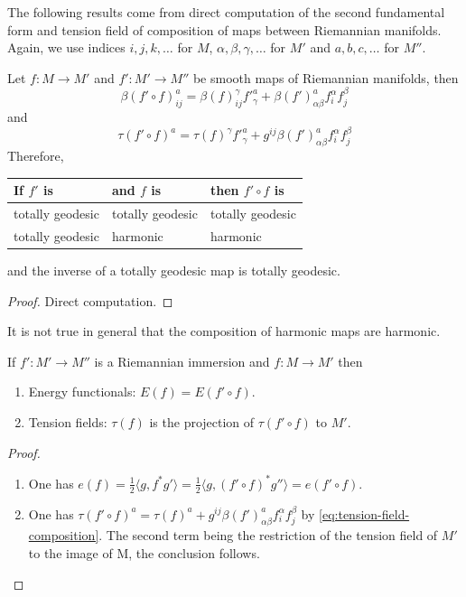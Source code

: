 The following results come from direct computation of the second fundamental form and
tension field of composition of maps between Riemannian manifolds. Again, we use indices
\(i,j,k,\dots\) for \(M\), \(\alpha,\beta,\gamma,\dots\) for \(M'\) and \(a,b,c,\dots\) for \(M''\).

\begin{proposition}
\label{prop:composition-general}
Let \(f: M \longrightarrow M'\) and \(f': M' \longrightarrow M''\) be smooth maps of
Riemannian manifolds, then
\begin{equation}
\label{eq:sff-composition}
\beta(f'\circ f)^a_{ij} = \beta(f)_{ij}^\gamma f'^a_\gamma + \beta(f')_{\alpha\beta}^a f^\alpha_i f^\beta_j
\end{equation}
and
\begin{equation}
\label{eq:tension-field-composition}
\tau(f'\circ f)^a = \tau(f)^\gamma f'^a_\gamma + g^{ij}\beta(f')^a_{\alpha\beta} f^\alpha_i f^\beta_j 
\end{equation}
Therefore,
\begin{center}
\begin{tabular}{lll}
If \(f'\) is & and \(f\)  is & then \(f'\circ f\) is\\
\hline
totally geodesic & totally geodesic & totally geodesic\\
totally geodesic & harmonic & harmonic\\
\end{tabular}
\end{center}
and the inverse of a totally geodesic map is totally geodesic.
\end{proposition}
\begin{proof}
Direct computation.
\end{proof}

\begin{remark}
It is not true in general that the composition of harmonic maps are harmonic.
\end{remark}

\begin{proposition}
\label{prop:compo-immersion}
If \(f': M' \longrightarrow M''\) is a Riemannian immersion and \(f: M \longrightarrow
M'\) then 
\begin{enumerate}
\item Energy functionals: \(E(f) = E(f'\circ f)\).
\item Tension fields: \(\tau(f)\) is the projection of \(\tau(f'\circ f)\) to \(M'\).
\end{enumerate}
\end{proposition}
\begin{proof}
\begin{enumerate}
\item One has \(e(f) = \frac{1}{2}\langle g, f^* g' \rangle  = \frac{1}{2}\langle g,
   (f'\circ f)^* g'' \rangle = e(f'\circ f)\).
\item One has \(\tau(f'\circ f)^a  = \tau(f)^a +
   g^{ij}\beta(f')^a_{\alpha\beta} f^\alpha_i f^\beta_j\) by
\eqref{eq:tension-field-composition}. The second term being the restriction of the
tension field of \(M'\) to the image of M, the conclusion follows.
\end{enumerate}
\end{proof}

